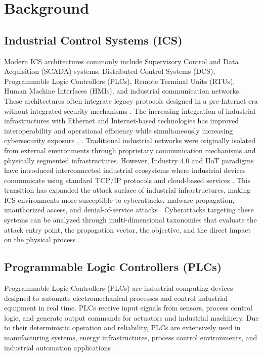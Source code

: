 \section{Background}\label{sec:background}
\subsection{Industrial Control Systems (ICS)}
Modern ICS architectures commonly include Supervisory Control and Data Acquisition (SCADA) systems, Distributed Control Systems (DCS), Programmable Logic Controllers (PLCs), Remote Terminal Units (RTUs), Human Machine Interfaces (HMIs), and industrial communication networks. These architectures often integrate legacy protocols designed in a pre-Internet era without integrated security mechanisms \cite{Zhu2011Taxonomy}. The increasing integration of industrial infrastructures with Ethernet and Internet-based technologies has improved interoperability and operational efficiency while simultaneously increasing cybersecurity exposure \cite{Bhamare2020ICS}, \cite{Kayan2021ICPS}. Traditional industrial networks were originally isolated from external environments through proprietary communication mechanisms and physically segmented infrastructures. However, Industry 4.0 and IIoT paradigms have introduced interconnected industrial ecosystems where industrial devices communicate using standard TCP/IP protocols and cloud-based services \cite{Souza2021SmartManufacturing}. This transition has expanded the attack surface of industrial infrastructures, making ICS environments more susceptible to cyberattacks, malware propagation, unauthorized access, and denial-of-service attacks \cite{Pedreira2021Industry40}. Cyberattacks targeting these systems can be analyzed through multi-dimensional taxonomies that evaluate the attack entry point, the propagation vector, the objective, and the direct impact on the physical process \cite{Zhu2011Taxonomy}.

\subsection{Programmable Logic Controllers (PLCs)}
Programmable Logic Controllers (PLCs) are industrial computing devices designed to automate electromechanical processes and control industrial equipment in real time. PLCs receive input signals from sensors, process control logic, and generate output commands for actuators and industrial machinery. Due to their deterministic operation and reliability, PLCs are extensively used in manufacturing systems, energy infrastructures, process control environments, and industrial automation applications \cite{Makrakis2021ICS}.

